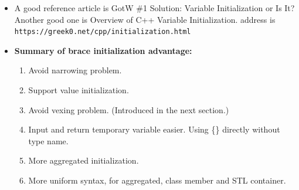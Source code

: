 \documentclass[a4paper,11pt,twoside]{book}
\begin{document}
\begin{itemize}
	\item A good reference article is GotW \#1 Solution: Variable Initialization or Is It? Another good one is Overview of C++ Variable Initialization. address is \\ \verb=https://greek0.net/cpp/initialization.html=
	
	\item \textbf{Summary of brace initialization advantage:}
\begin{enumerate}
	\item Avoid narrowing problem.
	\item Support value initialization.
	\item Avoid vexing problem. (Introduced in the next section.)
	\item Input and return temporary variable easier. Using \{\} directly without type name. 
	\item More aggregated initialization.
	\item More uniform syntax, for aggregated, class member and STL container. 
\end{enumerate}
\end{itemize}
\end{document}
